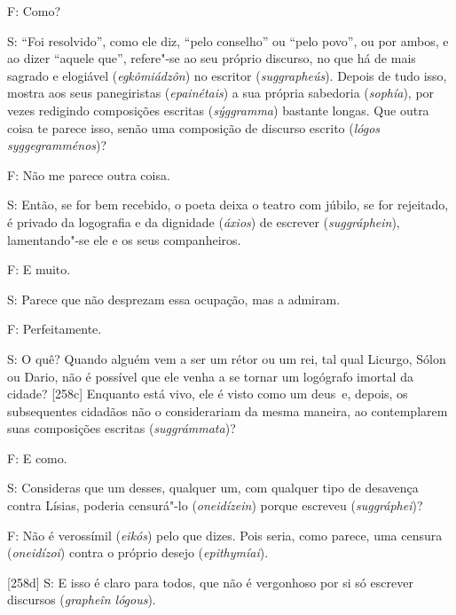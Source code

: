  

F: Como?

 

S: ``Foi resolvido'', como ele diz, ``pelo conselho'' ou ``pelo povo'',
ou por ambos, e ao dizer ``aquele que'', refere"-se ao seu próprio
discurso, no que há de mais sagrado e elogiável (\emph{egkômiádzôn}) no
escritor (\emph{suggrapheús}). Depois de tudo isso, mostra aos seus
panegiristas (\emph{epainétais}) a sua própria sabedoria
(\emph{sophía}), por vezes redigindo composições escritas
(\emph{sýggramma}) bastante longas. Que outra coisa te parece isso,
senão uma composição de discurso escrito (\emph{lógos syggegramménos})?

 

F: Não me parece outra coisa.

 

S: Então, se for bem recebido, o poeta deixa o teatro com júbilo, se for
rejeitado, é privado da logografia e da dignidade (\emph{áxios}) de
escrever (\emph{suggráphein}), lamentando"-se ele e os seus companheiros.

 

F: E muito.

 

S: Parece que não desprezam essa ocupação, mas a admiram.

 

F: Perfeitamente.

 

S: O quê? Quando alguém vem a ser um rétor ou um rei, tal qual Licurgo,
Sólon ou Dario, não é possível que ele venha a se tornar um logógrafo
imortal da cidade? [258c] Enquanto está vivo, ele é visto como um
deus~e, depois, os subsequentes cidadãos não o considerariam da mesma
maneira, ao contemplarem suas composições escritas (\emph{suggrámmata})?

 

F: E como.

 

S: Consideras que um desses, qualquer um, com qualquer tipo de desavença
contra Lísias, poderia censurá"-lo (\emph{oneidízein}) porque escreveu
(\emph{suggráphei})?

 

F: Não é verossímil (\emph{eikós}) pelo que dizes. Pois seria, como
parece, uma censura (\emph{oneidízoi}) contra o próprio desejo
(\emph{epithymíai}).

 

[258d] S: E isso é claro para todos, que não é vergonhoso por si só
escrever discursos (\emph{grapheîn lógous}).

